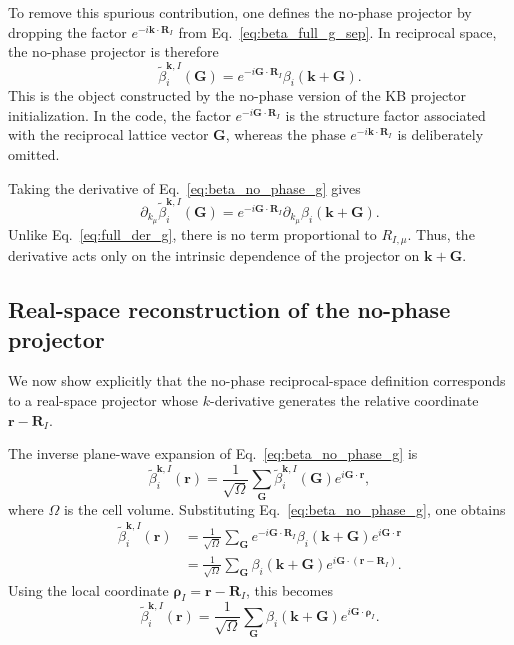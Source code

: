 \documentclass[11pt]{article}
\begin{document}
To remove this spurious contribution, one defines the no-phase projector
by dropping the factor $e^{-i\mathbf k\cdot\mathbf R_I}$ from
Eq.~\eqref{eq:beta_full_g_sep}. In reciprocal space, the no-phase
projector is therefore
\begin{equation}
\widetilde{\beta}_{i}^{\mathbf k,I}(\mathbf G)
=
e^{-i\mathbf G\cdot\mathbf R_I}
\beta_i(\mathbf k+\mathbf G).
\label{eq:beta_no_phase_g}
\end{equation}
This is the object constructed by the no-phase version of the KB
projector initialization. In the code, the factor
$e^{-i\mathbf G\cdot\mathbf R_I}$ is the structure factor associated
with the reciprocal lattice vector $\mathbf G$, whereas the phase
$e^{-i\mathbf k\cdot\mathbf R_I}$ is deliberately omitted.

Taking the derivative of Eq.~\eqref{eq:beta_no_phase_g} gives
\begin{equation}
\partial_{k_\mu}
\widetilde{\beta}_{i}^{\mathbf k,I}(\mathbf G)
=
e^{-i\mathbf G\cdot\mathbf R_I}
\partial_{k_\mu}\beta_i(\mathbf k+\mathbf G).
\label{eq:no_phase_der_g}
\end{equation}
Unlike Eq.~\eqref{eq:full_der_g}, there is no term proportional to
$R_{I,\mu}$. Thus, the derivative acts only on the intrinsic dependence
of the projector on $\mathbf k+\mathbf G$.

\subsection{Real-space reconstruction of the no-phase projector}

We now show explicitly that the no-phase reciprocal-space definition
corresponds to a real-space projector whose $k$-derivative generates
the relative coordinate $\mathbf r-\mathbf R_I$.

The inverse plane-wave expansion of Eq.~\eqref{eq:beta_no_phase_g} is
\begin{equation}
\widetilde{\beta}_{i}^{\mathbf k,I}(\mathbf r)
=
\frac{1}{\sqrt{\Omega}}
\sum_{\mathbf G}
\widetilde{\beta}_{i}^{\mathbf k,I}(\mathbf G)
e^{i\mathbf G\cdot\mathbf r},
\label{eq:inverse_pw_no_phase}
\end{equation}
where $\Omega$ is the cell volume. Substituting
Eq.~\eqref{eq:beta_no_phase_g}, one obtains
\begin{align}
\widetilde{\beta}_{i}^{\mathbf k,I}(\mathbf r)
&=
\frac{1}{\sqrt{\Omega}}
\sum_{\mathbf G}
e^{-i\mathbf G\cdot\mathbf R_I}
\beta_i(\mathbf k+\mathbf G)
e^{i\mathbf G\cdot\mathbf r}
\nonumber\\
&=
\frac{1}{\sqrt{\Omega}}
\sum_{\mathbf G}
\beta_i(\mathbf k+\mathbf G)
e^{i\mathbf G\cdot(\mathbf r-\mathbf R_I)} .
\label{eq:no_phase_real_sum}
\end{align}
Using the local coordinate
$\boldsymbol{\rho}_I=\mathbf r-\mathbf R_I$, this becomes
\begin{equation}
\widetilde{\beta}_{i}^{\mathbf k,I}(\mathbf r)
=
\frac{1}{\sqrt{\Omega}}
\sum_{\mathbf G}
\beta_i(\mathbf k+\mathbf G)
e^{i\mathbf G\cdot\boldsymbol{\rho}_I}.
\label{eq:no_phase_real_rho}
\end{equation}
\end{document}
